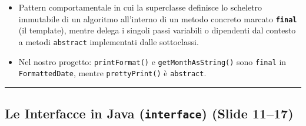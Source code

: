 \documentclass[11pt,a4paper,oneside]{report}
\newcommand{\passthrough}[1]{#1}
\providecommand{\tightlist}{\setlength{\itemsep}{0pt}\setlength{\parskip}{0pt}}
\begin{document}
\begin{itemize}
  \begin{itemize}
  \tightlist
  \item
    Pattern comportamentale in cui la superclasse definisce lo scheletro
    immutabile di un algoritmo all'interno di un metodo concreto marcato
    \textbf{\passthrough{\lstinline!final!}} (il template), mentre
    delega i singoli passi variabili o dipendenti dal contesto a metodi
    \passthrough{\lstinline!abstract!} implementati dalle sottoclassi.
  \item
    Nel nostro progetto: \passthrough{\lstinline!printFormat()!} e
    \passthrough{\lstinline!getMonthAsString()!} sono
    \passthrough{\lstinline!final!} in
    \passthrough{\lstinline!FormattedDate!}, mentre
    \passthrough{\lstinline!prettyPrint()!} è
    \passthrough{\lstinline!abstract!}.
  \end{itemize}
\end{itemize}

\begin{center}\rule{0.5\linewidth}{0.5pt}\end{center}

\subsection{\texorpdfstring{Le Interfacce in Java (\texttt{interface})
(Slide
11--17)}{Le Interfacce in Java (interface) (Slide 11--17)}}\label{chap12_le-interfacce-in-java-interface-slide-1117}
\end{document}
